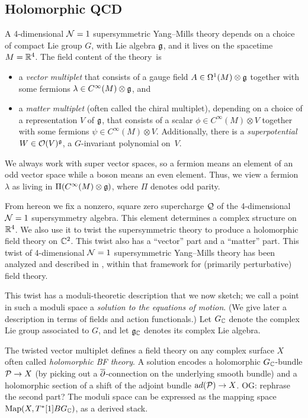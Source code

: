 \documentclass[11pt]{amsart}
\def\owen#1{{\textcolor{violet!65!black}{OG: {#1}}}}
\begin{document}
\subsection{Holomorphic QCD}

A 4-dimensional $\mathcal N=1$ supersymmetric Yang--Mills theory depends on a choice of compact Lie group $G$, with Lie algebra $\mathfrak g$, 
and it lives on  the spacetime $M=\mathbb R^4$.
The field content of the theory~is
\begin{itemize}
\item a {\it vector multiplet} that consists of a gauge field $A \in \Omega^1(M) \otimes \mathfrak g $ together with some fermions $\lambda \in C^\infty(M) \otimes \mathfrak g$, and
\item a {\it matter multiplet} (often called the chiral multiplet), depending on a choice of a representation $V$ of $\mathfrak g$, that consists of a scalar $\phi \in C^\infty(M) \otimes V$ together with some fermions $\psi \in C^\infty(M) \otimes V$. 
Additionally, there is a {\it superpotential} $W \in \mathcal O(V)^\mathfrak g$, a $G$-invariant polynomial on~$V$. 
\end{itemize}
We always work with super vector spaces, so a fermion means an element of an odd vector space while a boson means an even element.
Thus, we view a fermion $\lambda$ as living in $\Pi (C^\infty(M) \otimes \mathfrak g)$,
where $\Pi$ denotes odd parity.

From hereon we fix a nonzero, square zero supercharge $\mathcal Q$ of the 4-dimensional $\mathcal N=1$ supersymmetry algebra.
This element determines a complex structure on $\mathbb R^4$.
We also use it to twist the supersymmetric theory to produce a holomorphic field theory on $\mathbb C^2$.
This twist also has a ``vector'' part and a ``matter'' part.
This twist of 4-dimensional $\mathcal N=1$ supersymmetric Yang--Mills theory has been analyzed and described in \cite{CosYangian, ESW, SWchar}, within that framework for (primarily perturbative) field theory. 

This twist has a moduli-theoretic description that we now sketch;
we call a point in such a moduli space a {\it solution to the equations of motion}. 
(We give later a description in terms of fields and action functionals.)
Let $G_\mathbb C$ denote the complex Lie group associated to $G$,
and let $\mathfrak g_\mathbb C$ denotes its complex Lie algebra.

The twisted vector multiplet defines a field theory on any complex surface $X$ often called {\em holomorphic BF theory}. 
A solution encodes a holomorphic $G_\mathbb C$-bundle $\mathcal P \to X$ (by picking out a ${\overline{\partial}}$-connection on the underlying smooth bundle) and a holomorphic section of a shift of the adjoint bundle ${\mathrm ad}(\mathcal P) \to X$.
\owen{rephrase the second part?}
The moduli space can be expressed as the mapping space ${\rm Map}(X, T^*[1]BG_{\mathbb C})$, as a derived stack.
\end{document}
